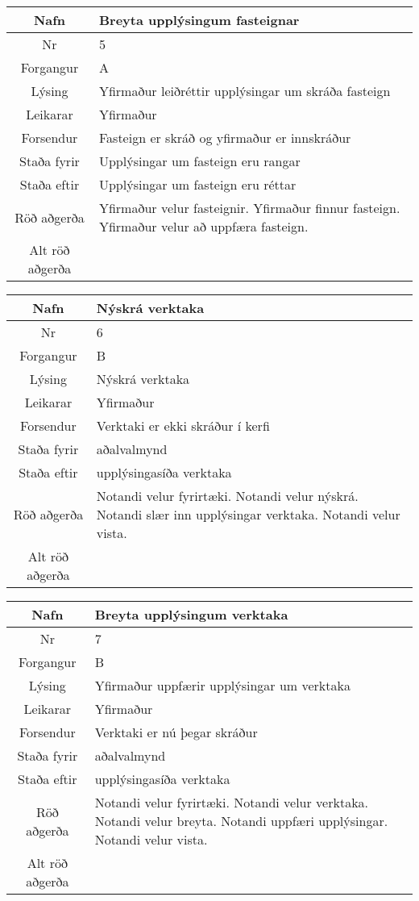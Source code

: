 \begin{table}[h!]\centering
\begin{tabular}{|c|p{10cm}|}
\hline
Nafn&Breyta upplýsingum fasteignar\\
\hline
Nr&5\\
\hline
Forgangur&A\\
\hline
Lýsing&Yfirmaður leiðréttir upplýsingar um skráða fasteign\\
\hline
Leikarar&Yfirmaður\\
\hline
Forsendur&Fasteign er skráð og yfirmaður er innskráður\\
\hline
Staða fyrir&Upplýsingar um fasteign eru rangar\\
\hline
Staða eftir&Upplýsingar um fasteign eru réttar\\
\hline
Röð aðgerða&Yfirmaður velur fasteignir. Yfirmaður finnur fasteign. Yfirmaður velur að uppfæra fasteign.\\
\hline
Alt röð aðgerða&\\
\hline
\end{tabular}
\end{table}
\caption{Use case 5}\label{tab:use_case_5}
\begin{table}[h!]\centering
\begin{tabular}{|c|p{10cm}|}
\hline
Nafn&Nýskrá verktaka \\
\hline
Nr&6\\
\hline
Forgangur&B\\
\hline
Lýsing&Nýskrá verktaka \\
\hline
Leikarar&Yfirmaður\\
\hline
Forsendur&Verktaki er ekki skráður í kerfi\\
\hline
Staða fyrir&aðalvalmynd\\
\hline
Staða eftir&upplýsingasíða verktaka\\
\hline
Röð aðgerða&Notandi velur fyrirtæki. Notandi velur nýskrá. Notandi slær inn upplýsingar verktaka. Notandi velur vista.\\
\hline
Alt röð aðgerða&\\
\hline
\end{tabular}
\end{table}
\caption{Use case 6}\label{tab:use_case_6}
\begin{table}[h!]\centering
\begin{tabular}{|c|p{10cm}|}
\hline
Nafn&Breyta upplýsingum verktaka \\
\hline
Nr&7\\
\hline
Forgangur&B\\
\hline
Lýsing&Yfirmaður uppfærir upplýsingar um verktaka\\
\hline
Leikarar&Yfirmaður\\
\hline
Forsendur&Verktaki er nú þegar skráður\\
\hline
Staða fyrir&aðalvalmynd\\
\hline
Staða eftir&upplýsingasíða verktaka\\
\hline
Röð aðgerða&Notandi velur fyrirtæki. Notandi velur verktaka. Notandi velur breyta. Notandi uppfæri upplýsingar. Notandi velur vista.\\
\hline
Alt röð aðgerða&\\
\hline
\end{tabular}
\end{table}
